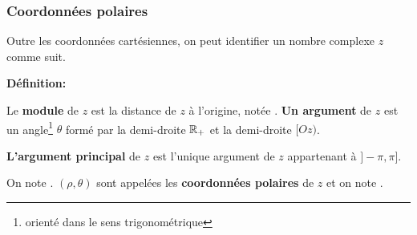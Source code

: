 \begin{frame}%
\frametitle{\bf Coordonnées polaires}
\medskip 

Outre les coordonnées cartésiennes, on peut identifier un nombre complexe $z$ comme suit.

\medskip

{\bf D\'efinition:} 
\begin{itemize}
\bitem
Le {\bf module} de $z$ est la distance de $z$ à l'origine, notée . %
\bitem
{\bf Un argument} de $z$ est un angle\footnote{orienté dans le sens trigonométrique} $\theta$ formé par la demi-droite $\mathbb R_+$ et la demi-droite $[Oz)$.
\begin{center}
\end{center}
\bitem 
{\bf L'argument principal} de $z$ est l'unique argument de $z$ appartenant à $]-\pi,\pi]$. 

On note \framebox{${\theta=\arg(z)\in]-\pi,\pi]}$}.
\bitem
$(\rho,\theta)$ sont appelées les {\bf coordonnées polaires} de $z$ et on note .
\end{itemize}


\end{frame}
